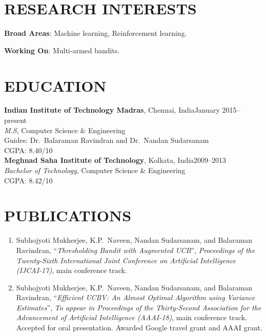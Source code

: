 \documentclass[margin,11pt]{res}
\begin{document}
\begin{resume}

\section{RESEARCH INTERESTS}
\textbf{Broad Areas}: Machine learning, Reinforcement learning.

\par
\textbf{Working On}: Multi-armed bandits.


\section{EDUCATION}
\textbf{Indian Institute of Technology Madras}, Chennai, India\hfill January 2015--present\\
{\sl M.S}, Computer Science \& Engineering
\\Guides: Dr.~Balaraman Ravindran and Dr.~Nandan Sudarsanam\\CGPA: 8.40/10
\\[0.25cm]
\textbf{Meghnad Saha Institute of Technology}, Kolkata, India\hfill 2009--2013\\
{\sl Bachelor of Technology}, Computer Science \& Engineering\\ CGPA: 8.42/10
\section{PUBLICATIONS}
\begin{enumerate}[leftmargin=*]
\item Subhojyoti Mukherjee, K.P.~Naveen, Nandan Sudarsanam, and Balaraman Ravindran, ``\textit{Thresholding Bandit with Augmented UCB}'', \textit{Proceedings of the Twenty-Sixth International Joint Conference on Artificial Intelligence (IJCAI-17)}, main conference track.
\item Subhojyoti Mukherjee, K.P.~Naveen, Nandan Sudarsanam, and Balaraman Ravindran, ``\textit{Efficient UCBV: An Almost Optimal Algorithm using Variance Estimates}'', \textit{To appear in Proceedings of the Thirty-Second Association for the Advancement of Artificial Intelligence (AAAI-18)}, main conference track. Accepted for oral presentation. Awarded Google travel grant and AAAI grant.
\end{enumerate}


\end{resume}
\end{document}
